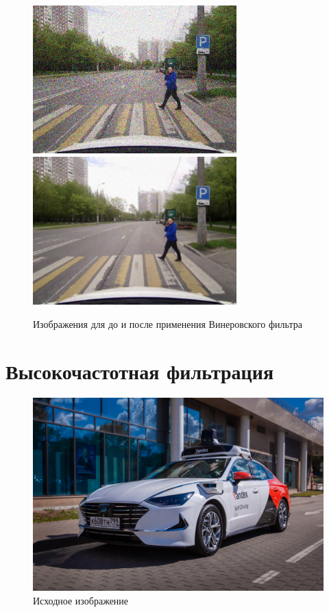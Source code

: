 \pagebreak

\begin{figure}[ht]
    \centering
    \includegraphics[width=0.7\textwidth]{../outputs/image_gauss_noise.png}
    \includegraphics[width=0.7\textwidth]{../outputs/image_quant_filter.png}
    \caption{Изображения для до и после применения Винеровского фильтра}
    \label{fig:stitch_images}
\end{figure}

\pagebreak

\section{Высокочастотная фильтрация}

\begin{figure}[ht]
    \centering
    \includegraphics[width=\textwidth]{../source/SDC_Yandex.png}
    \caption{Исходное изображение}
    \label{fig:stitch_images}
\end{figure}



